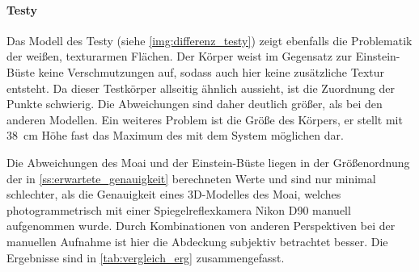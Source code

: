 \documentclass[./00PhotoBox.tex]{subfiles}
\begin{document}
\paragraph{Testy}
Das Modell des Testy (siehe \autoref{img:differenz_testy}) zeigt ebenfalls die Problematik der weißen, texturarmen Flächen. Der Körper weist im Gegensatz zur Einstein-Büste keine Verschmutzungen auf, sodass auch hier keine zusätzliche Textur entsteht. Da dieser Testkörper allseitig ähnlich aussieht, ist die Zuordnung der Punkte schwierig. Die Abweichungen sind daher deutlich größer, als bei den anderen Modellen. Ein weiteres Problem ist die Größe des Körpers, er stellt mit \SI{38}{\centi\metre} Höhe fast das Maximum des mit dem System möglichen dar.

Die Abweichungen des Moai und der Einstein-Büste liegen in der Größenordnung der in \autoref{ss:erwartete_genauigkeit} berechneten Werte und sind nur minimal schlechter, als die Genauigkeit eines 3D-Modelles des Moai, welches photogrammetrisch mit einer Spiegelreflexkamera Nikon D90 manuell aufgenommen wurde. Durch Kombinationen von anderen Perspektiven bei der manuellen Aufnahme ist hier die Abdeckung subjektiv betrachtet besser. Die Ergebnisse sind in \autoref{tab:vergleich_erg} zusammengefasst.
\end{document}
